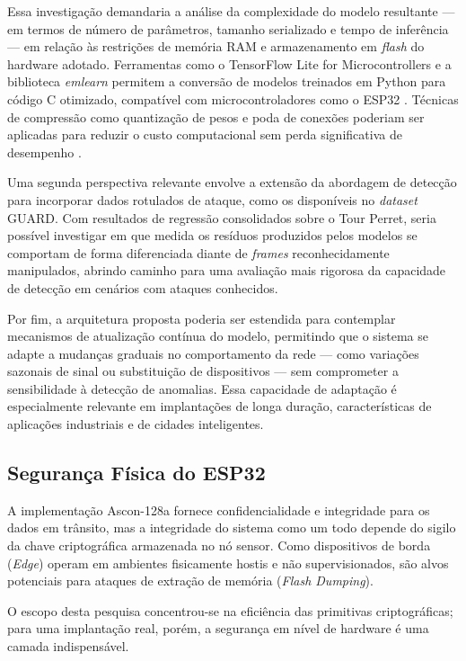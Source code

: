 Essa investigação demandaria a análise da complexidade do modelo resultante 
— em termos de número de parâmetros, tamanho serializado e tempo de 
inferência — em relação às restrições de memória RAM e armazenamento em 
\textit{flash} do hardware adotado. Ferramentas como o TensorFlow Lite for 
Microcontrollers e a biblioteca \textit{emlearn} permitem a conversão de 
modelos treinados em Python para código C otimizado, compatível com 
microcontroladores como o ESP32 \cite{ray2022}. Técnicas de compressão como 
quantização de pesos e poda de conexões poderiam ser aplicadas para reduzir 
o custo computacional sem perda significativa de desempenho \cite{jacob2018}.

Uma segunda perspectiva relevante envolve a extensão da abordagem de 
detecção para incorporar dados rotulados de ataque, como os disponíveis no 
\textit{dataset} GUARD. Com resultados de regressão consolidados sobre o 
Tour Perret, seria possível investigar em que medida os resíduos produzidos 
pelos modelos se comportam de forma diferenciada diante de \textit{frames} 
reconhecidamente manipulados, abrindo caminho para uma avaliação mais 
rigorosa da capacidade de detecção em cenários com ataques conhecidos.

Por fim, a arquitetura proposta poderia ser estendida para contemplar 
mecanismos de atualização contínua do modelo, permitindo que o sistema se 
adapte a mudanças graduais no comportamento da rede — como variações 
sazonais de sinal ou substituição de dispositivos — sem comprometer a 
sensibilidade à detecção de anomalias. Essa capacidade de adaptação é 
especialmente relevante em implantações de longa duração, características 
de aplicações industriais e de cidades inteligentes.


\subsection{Segurança Física do ESP32}
A implementação Ascon-128a fornece confidencialidade e integridade para os dados em trânsito, mas a integridade do sistema como um todo depende do sigilo da chave criptográfica armazenada no nó sensor. Como dispositivos de borda (\textit{Edge}) operam em ambientes fisicamente hostis e não supervisionados, são alvos potenciais para ataques de extração de memória (\textit{Flash Dumping}).

O escopo desta pesquisa concentrou-se na eficiência das primitivas criptográficas; para uma implantação real, porém, a segurança em nível de hardware é uma camada indispensável.

